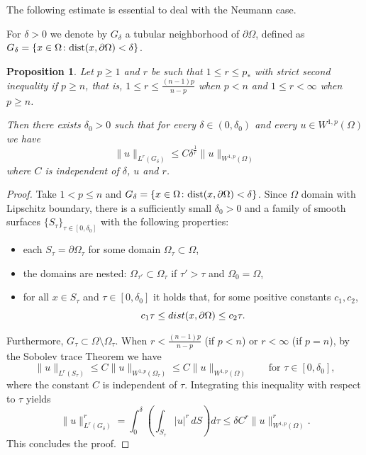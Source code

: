 \documentclass[12pt]{amsart}
\newtheorem{prop}[thm]{Proposition}
\theoremstyle{definition}
\theoremstyle{remark}
\numberwithin{equation}{section}
\begin{document}
The following estimate is essential to deal with the Neumann case.

For $\delta>0$ we denote by $G_\delta$ a tubular neighborhood of $\partial\Omega$, defined as $G_\delta=\{x\in\Omega\colon \text{\normalfont dist} (x,\partial\Omega)<\delta\}$.

\begin{prop} \label{prop2}
Let $p\geq 1$ and $r$ be such that $1\leq r \leq p_*$ with strict second inequality if $p\geq n$, that is, $1\leq r \leq \frac{(n-1)p}{n-p}$ when $p<n$ and $1\leq r <\infty$ when $p\geq n$.

Then there exists $\delta_0>0$ such that for every $\delta\in (0,\delta_0)$ and every $u\in W^{1,p}(\Omega)$ we have
$$
\|u\|_{L^r(G_\delta)} \leq C \delta^\frac1r \|u\|_{W^{1,p}(\Omega)}
$$
where $C$ is independent of $\delta$, $u$ and $r$.
\end{prop}

\begin{proof}
Take $1<p\leq n$ and  $G_\delta=\{x\in \Omega\colon \text{\normalfont dist}(x,\partial\Omega) <\delta\}$.  Since $\Omega$ domain with Lipschitz boundary,  there is a sufficiently small $\delta_0>0$ and a family of smooth surfaces $\{S_\tau\}_{\tau\in[0,\delta_0]}$ with the following properties:
\begin{itemize}
\item[i)] each $S_\tau=\partial \Omega_\tau$ for some  domain $\Omega_\tau\subset \Omega$,
\item[ii)] the domains are nested: $\Omega_{\tau'}\subset \Omega_\tau$ if $\tau'>\tau$ and $\Omega_0=\Omega$,
\item[iii)] for all $x\in S_\tau$ and $\tau\in [0,\delta_0]$ it holds that, for some positive constants $c_1,c_2$, 
$$c_1\tau \leq {\normalfont dist}(x,\partial\Omega) \leq c_2\tau.$$
\end{itemize}
Furthermore, $G_\tau \subset \Omega\setminus \Omega_\tau$.  When $r<\frac{(n-1)p}{n-p}$ (if $p<n$) or $r<\infty$ (if $p=n$), by the Sobolev trace Theorem we have
$$
\|u\|_{L^r(S_\tau)} \leq C \|u\|_{W^{1,p}(\Omega_\tau)} \leq C \|u\|_{W^{1,p}(\Omega)} \qquad \text{for }\tau\in[0,\delta_0],
$$
where the constant $C$  is independent of $\tau$. Integrating this inequality with respect to $\tau$ yields
$$
\|u\|_{L^r(G_\delta)}^r =\int_0^\delta \left(\int_{S_\tau} |u|^r\,dS \right)d\tau \leq \delta C^r \|u\|_{W^{1,p}(\Omega)}^r.
$$
This concludes the proof.
\end{proof}

 
\end{document}
